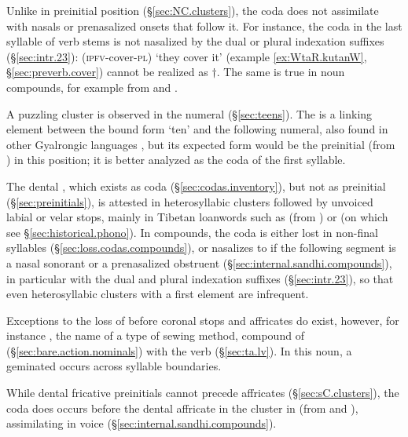 Unlike  in preinitial position (§\ref{sec:NC.clusters}), the coda  does not assimilate with nasals or prenasalized onsets that follow it. For instance,  the coda  in the last syllable of verb stems is not nasalized by the dual  or plural  indexation suffixes (§\ref{sec:intr.23}):  (\textsc{ipfv}-cover-\textsc{pl}) `they cover it' (example \ref{ex:WtaR.kutanW}, §\ref{sec:preverb.cover}) cannot be realized as $\dagger$. The same is true in noun compounds, for example  from  and .

A puzzling cluster  is observed in the numeral  (§\ref{sec:teens}). The  is a linking element between the bound form  `ten' and the following numeral, also found in other Gyalrongic languages \citep{jacques17num}, but its expected form would be the preinitial  (from ) in this position; it is better analyzed as the coda of the first syllable.

The dental , which exists as coda (§\ref{sec:codas.inventory}), but not as preinitial (§\ref{sec:preinitials}), is attested in heterosyllabic clusters followed by unvoiced labial or velar stops, mainly in Tibetan loanwords such as  (from ) or  (on which see §\ref{sec:historical.phono}). In compounds, the coda  is either lost in non-final syllables (§\ref{sec:loss.codas.compounds}), or nasalizes to  if the following segment is a nasal sonorant or a prenasalized obstruent (§\ref{sec:internal.sandhi.compounds}), in particular with the dual  and plural  indexation suffixes (§\ref{sec:intr.23}), so that even heterosyllabic clusters with  a first element are infrequent. 

Exceptions to the loss of  before coronal stops and affricates do exist, however, for instance , the name of a type of sewing method, compound of  (§\ref{sec:bare.action.nominals}) with the verb  (§\ref{sec:ta.lv}). In this noun, a geminated  occurs across syllable boundaries.

While dental fricative preinitials cannot precede affricates (§\ref{sec:sC.clusters}), the coda  does occurs before the dental affricate  in the cluster  in  (from  and ), assimilating in voice (§\ref{sec:internal.sandhi.compounds}).

